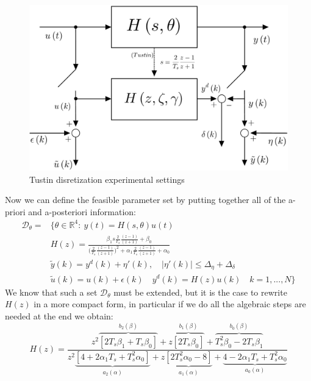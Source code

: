 \begin{figure}
    \centering
    \includegraphics[scale=0.21]{img/Tustin.jpg}
    \caption{Tustin disretization experimental settings}
    \label{fig:Tustin_1}
\end{figure}

Now we can define the feasible parameter set by putting together all of the a-priori and a-posteriori information:
\begin{equation}
    \begin{aligned}
        \mathcal{D}_{\theta}=&\big\{\theta\in\mathbb{R}^4: 
            \ y(t)=H(s,\theta)u(t) \\
            &H(z)=\frac{
        {\beta_1{s\frac{2}{T_s}\frac{(z-1)}{(z+1)}}+\beta_0}
    }{
        \Big(\frac{2}{T_s}\frac{(z-1)}{(z+1)}\Big)^2+\alpha_1{\frac{2}{T_s}\frac{(z-1)}{(z+1)}}+\alpha_0
    }\\ 
        &\tilde{y}(k)=y^d(k)+\eta'(k), \quad  \vert \eta'(k) \vert \le \Delta_\eta+\Delta_\delta\\
        &\tilde{u}(k)=u(k)+\epsilon(k) \quad y^d(k)=H(z)u(k) \quad k=1,...,N
        \big\}
    \end{aligned}
\end{equation}
\noindent
We know that such a set $\mathcal{D}_{\theta}$ must be extended, but it is the case to rewrite $H(z)$ in a more compact form, in particular if we do all the algebraic steps are needed at the end we obtain:
\begin{equation}
    H(z)=\frac{
        z^2 \overbrace{[2T_s\beta_1+T_s \beta_0]}^{b_2(\beta)}+
        z \overbrace{{[2T_s\beta_0]}}^{b_1(\beta)}+ 
        \overbrace{T_s^2\beta_0-2T_s\beta_1}^{b_0(\beta)}}
        {
            z^2\underbrace{[4+2\alpha_1T_s+T_s^2\alpha_0]}_{a_2(\alpha)}+
            z \underbrace{[2T_s^2\alpha_0-8]}_{a_1(\alpha)}+
            \underbrace{4-2\alpha_1T_s+T_s^2\alpha_0}_{a_0(\alpha)}
        }
\end{equation}

